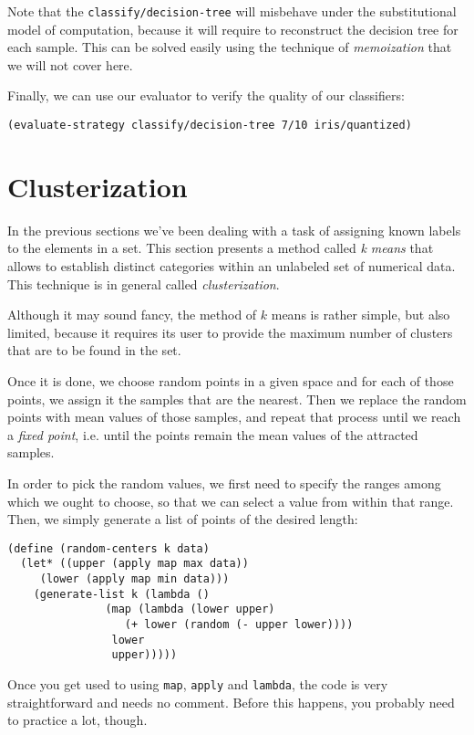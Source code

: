 Note that the \texttt{classify/decision-tree} will
misbehave under the substitutional model of computation,
because it will require to reconstruct the decision tree
for each sample. This can be solved easily using the
technique of \textit{memoization} that we will not cover
here.

Finally, we can use our evaluator to verify the quality
of our classifiers:

\begin{Verbatim}
(evaluate-strategy classify/decision-tree 7/10 iris/quantized)
\end{Verbatim}

\section{Clusterization}
In the previous sections we've been dealing with a task
of assigning known labels to the elements in a set. This
section presents a method called \textit{k means} that
allows to establish distinct categories within an unlabeled
set of numerical data. This technique is in general called
\textit{clusterization}.

Although it may sound fancy, the method of $k$ means is
rather simple, but also limited, because it requires its
user to provide the maximum number of clusters that are
to be found in the set.

Once it is done, we choose random points in a given space
and for each of those points, we assign it the samples that
are the nearest. Then we replace the random points with
mean values of those samples, and repeat that process
until we reach a \textit{fixed point}, i.e. until the
points remain the mean values of the attracted samples.

In order to pick the random values, we first need to
specify the ranges among which we ought to choose, so
that we can select a value from within that range.
Then, we simply generate a list of points of the desired
length:

\begin{Verbatim}[samepage=true]
(define (random-centers k data)
  (let* ((upper (apply map max data))
	 (lower (apply map min data)))
    (generate-list k (lambda ()
		       (map (lambda (lower upper)
			      (+ lower (random (- upper lower))))
			    lower
			    upper)))))
\end{Verbatim}

Once you get used to using \texttt{map}, \texttt{apply} and
\texttt{lambda}, the code is very straightforward and needs
no comment. Before this happens, you probably need to practice
a lot, though.

